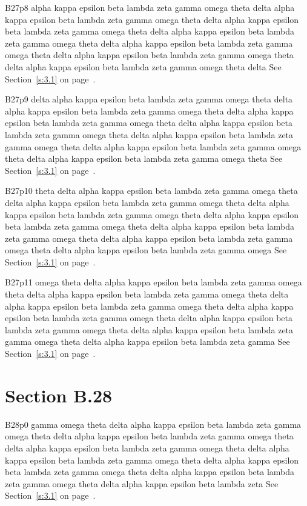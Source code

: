 B27p8 alpha kappa epsilon beta lambda zeta gamma omega theta delta alpha kappa epsilon beta lambda zeta gamma omega theta delta alpha kappa epsilon beta lambda zeta gamma omega theta delta alpha kappa epsilon beta lambda zeta gamma omega theta delta alpha kappa epsilon beta lambda zeta gamma omega theta delta alpha kappa epsilon beta lambda zeta gamma omega theta delta alpha kappa epsilon beta lambda zeta gamma omega theta delta See Section~\ref{s:3.1} on page~\pageref{s:3.1}.

B27p9 delta alpha kappa epsilon beta lambda zeta gamma omega theta delta alpha kappa epsilon beta lambda zeta gamma omega theta delta alpha kappa epsilon beta lambda zeta gamma omega theta delta alpha kappa epsilon beta lambda zeta gamma omega theta delta alpha kappa epsilon beta lambda zeta gamma omega theta delta alpha kappa epsilon beta lambda zeta gamma omega theta delta alpha kappa epsilon beta lambda zeta gamma omega theta See Section~\ref{s:3.1} on page~\pageref{s:3.1}.

B27p10 theta delta alpha kappa epsilon beta lambda zeta gamma omega theta delta alpha kappa epsilon beta lambda zeta gamma omega theta delta alpha kappa epsilon beta lambda zeta gamma omega theta delta alpha kappa epsilon beta lambda zeta gamma omega theta delta alpha kappa epsilon beta lambda zeta gamma omega theta delta alpha kappa epsilon beta lambda zeta gamma omega theta delta alpha kappa epsilon beta lambda zeta gamma omega See Section~\ref{s:3.1} on page~\pageref{s:3.1}.

B27p11 omega theta delta alpha kappa epsilon beta lambda zeta gamma omega theta delta alpha kappa epsilon beta lambda zeta gamma omega theta delta alpha kappa epsilon beta lambda zeta gamma omega theta delta alpha kappa epsilon beta lambda zeta gamma omega theta delta alpha kappa epsilon beta lambda zeta gamma omega theta delta alpha kappa epsilon beta lambda zeta gamma omega theta delta alpha kappa epsilon beta lambda zeta gamma See Section~\ref{s:3.1} on page~\pageref{s:3.1}.

\section{Section B.28}\label{s:B.28}
B28p0 gamma omega theta delta alpha kappa epsilon beta lambda zeta gamma omega theta delta alpha kappa epsilon beta lambda zeta gamma omega theta delta alpha kappa epsilon beta lambda zeta gamma omega theta delta alpha kappa epsilon beta lambda zeta gamma omega theta delta alpha kappa epsilon beta lambda zeta gamma omega theta delta alpha kappa epsilon beta lambda zeta gamma omega theta delta alpha kappa epsilon beta lambda zeta See Section~\ref{s:3.1} on page~\pageref{s:3.1}.

